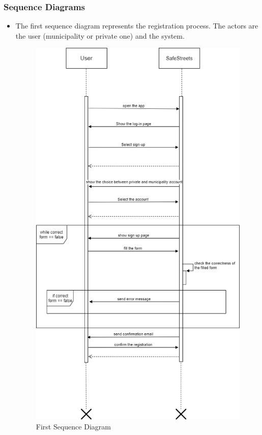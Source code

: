 \documentclass[titlepage]{article}
\begin{document}
\subsubsection{Sequence Diagrams}
\begin{itemize}

\item The first sequence diagram represents the registration process. The actors are the user (municipality or private one) and the system. 

\begin{figure}[h]
	\includegraphics[scale=0.365]{Sequence Diagrams/Sequence diagram sign-up.png}
	\centering
	\caption{First Sequence Diagram}
\end{figure}
\FloatBarrier 


\end{itemize}
\end{document}
